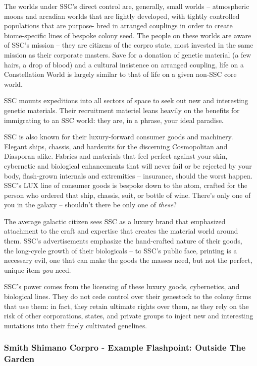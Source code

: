 The worlds under SSC’s direct control are, generally, small worlds -- atmospheric moons and
arcadian worlds that are lightly developed, with tightly controlled populations that are purpose-
bred in arranged couplings in order to create biome-specific lines of bespoke colony seed. The
people on these worlds are aware of SSC’s mission -- they are citizens of the corpro state, most
invested in the same mission as their corporate masters. Save for a donation of genetic material
(a few hairs, a drop of blood) and a cultural insistence on arranged coupling, life on a
Constellation World is largely similar to that of life on a given non-SSC core world.

SSC mounts expeditions into all sectors of space to seek out new and interesting genetic
materials. Their recruitment materiel leans heavily on the benefits for immigrating to an SSC
world: they are, in a phrase, your ideal paradise.

SSC is also known for their luxury-forward consumer goods and machinery. Elegant ships,
chassis, and hardsuits for the discerning Cosmopolitan and Diasporan alike. Fabrics and
materials that feel perfect against your skin, cybernetic and biological enhancements that will
never fail or be rejected by your body, flash-grown internals and extremities -- insurance, should
the worst happen. SSC’s LUX line of consumer goods is bespoke down to the atom, crafted for
the person who ordered that ship, chassis, suit, or bottle of wine. There’s only one of you in the
galaxy -- shouldn’t there be only one of \textit{these}?

The average galactic citizen sees SSC as a luxury brand that emphasized attachment to the craft
and expertise that creates the material world around them. SSC’s advertisements emphasize the
hand-crafted nature of their goods, the long-cycle growth of their biologicals -- to SSC’s public
face, printing is a necessary evil, one that can make the goods the masses need, but not the
perfect, unique item \textit{you} need.

SSC’s power comes from the licensing of these luxury goods, cybernetics, and biological lines.
They do not cede control over their genestock to the colony firms that use them: in fact, they
retain ultimate rights over them, as they rely on the risk of other corporations, states, and private
groups to inject new and interesting mutations into their finely cultivated genelines.

\subsubsection[Example Flashpoint: Outside The Garden]{Smith Shimano Corpro - Example Flashpoint: Outside The Garden  }

